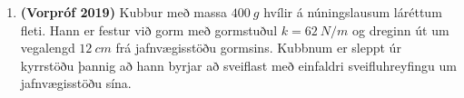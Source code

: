 \ifdefined \wholebook \else\documentclass[oneside]{book}\usepackage{EdlBook}\graphicspath{{figures/}}
\begin{document}
\begin{enumerate}[label = \textbf{Dæmi \thechapter.\arabic*.}]
\item \textbf{(Vorpróf 2019)} Kubbur með massa $\SI{400}{g}$ hvílir á núningslausum láréttum fleti. Hann er festur við gorm með gormstuðul $k = \SI{62}{N/m}$ og dreginn út um vegalengd $\SI{12}{cm}$ frá jafnvægisstöðu gormsins. Kubbnum er sleppt úr kyrrstöðu þannig að hann byrjar að sveiflast með einfaldri sveifluhreyfingu um jafnvægisstöðu sína. 

\vspace{0.1cm}


\end{enumerate}
\end{document}
